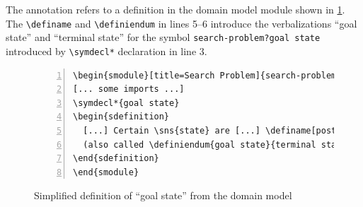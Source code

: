\documentclass{llncs}
\begin{document}
The annotation refers to a definition in the domain model module shown in
\cref{fig:state-space}.  The \lstinline|\definame| and \lstinline|\definiendum| in lines
5--6 introduce the verbalizations ``goal state'' and ``terminal state'' for the symbol
\lstinline|search-problem?goal state| introduced by \lstinline|\symdecl*| declaration in
line 3.

\begin{figure}[ht]\centering
\begin{lstlisting}[morekeywords={definame,symdecl,definiendum},numbers=left]
\begin{smodule}[title=Search Problem]{search-problem}
[... some imports ...]
\symdecl*{goal state}
\begin{sdefinition}
  [...] Certain \sns{state} are [...] \definame[post=s]{goal state} [...]
  (also called \definiendum{goal state}{terminal states}).
\end{sdefinition}
\end{smodule}
\end{lstlisting}
  \caption{Simplified definition of ``goal state'' from the domain model}\label{fig:state-space}
\end{figure}
\end{document}
